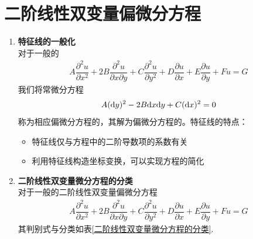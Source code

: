 \section{二阶线性双变量偏微分方程}
\begin{enumerate}[1.]
	\item \textbf{特征线的一般化}\\
	\hspace*{2em}对于一般的
	\begin{align}
		A \dfrac{\partial^2 u}{\partial x^2} + 2B\dfrac{\partial^2 u}{\partial x \partial y} + C \dfrac{\partial^2 u}{\partial y^2} + D\dfrac{\partial u}{\partial x} + E \dfrac{\partial u}{\partial y} + Fu = G
	\end{align}
	我们将常微分方程
	\begin{align}
		A({\rm{d}} y)^2 -2 B {\rm{d}} x {\rm{d}} y + C({\rm{d}} x)^2 = 0
	\end{align}
	称为相应偏微分方程的，其解为偏微分方程的。特征线的特点：
	\begin{itemize}
		\item 特征线仅与方程中的二阶导数项的系数有关
		\item 利用特征线构造坐标变换，可以实现方程的简化
	\end{itemize}
\vspace*{0.5em}
	
	\item \textbf{二阶线性双变量微分方程的分类}\\
	\hspace*{2em} 对于一般的二阶线性双变量偏微分方程
	\begin{align*}
			A \dfrac{\partial^2 u}{\partial x^2} + 2B\dfrac{\partial^2 u}{\partial x \partial y} + C \dfrac{\partial^2 u}{\partial y^2} + D\dfrac{\partial u}{\partial x} + E \dfrac{\partial u}{\partial y} + Fu = G
	\end{align*}
其判别式与分类如表\ref{二阶线性双变量微分方程的分类}.
	\begin{table}[!htb]
		\centering
		\caption{二阶线性双变量微分方程的分类}
		\label{二阶线性双变量微分方程的分类}
	\end{table} 
	
\end{enumerate}

